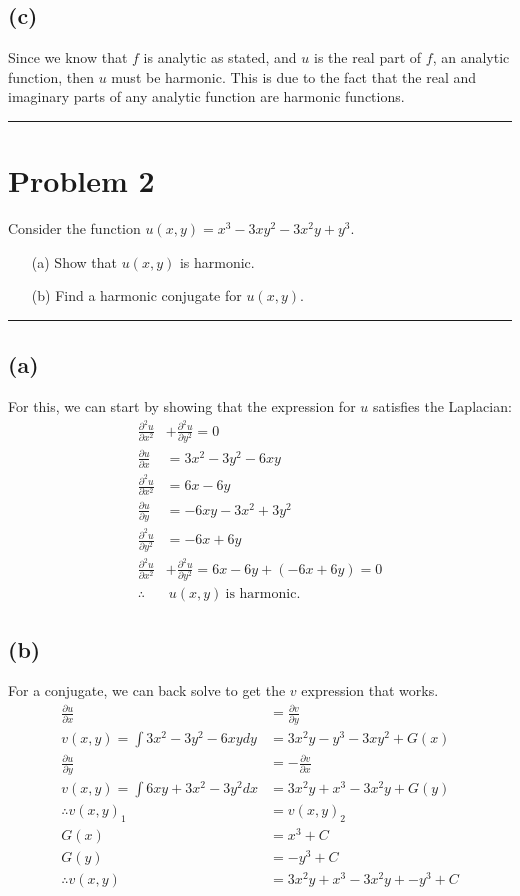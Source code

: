 \documentclass{article}
\newcommand{\parder}[2]{\frac{\partial#1}{\partial#2}}
\newcommand{\secparder}[2]{\frac{\partial^2#1}{\partial#2^2}}
\begin{document}
\subsection{(c)}
Since we know that $f$ is analytic as stated, and $u$ is the real part of $f$, an analytic function, then $u$ must be harmonic. This is due to the fact that the real and imaginary parts of any analytic function are harmonic functions.
\vspace{.2cm}
\hrule

\section*{Problem 2}
Consider the function  $u(x,y) = x^3 - 3 x y^2 - 3 x^2 y + y^3$.

\begin{enumerate}
	\item [(a)] Show that $u(x,y)$ is harmonic.
	\item [(b)] Find a harmonic conjugate for $u(x,y)$.
\end{enumerate}


\vspace{.5cm} %

\hrule
\subsection*{(a)}
For this, we can start by showing that the expression for $u$ satisfies the Laplacian:
\begin{align*}
  \secparder{u}{x} &+ \secparder{u}{y} = 0\\
  \parder{u}{x} &= 3x^2 - 3 y^2 - 6xy\\
  \secparder{u}{x} &= 6x - 6y\\
  \parder{u}{y} &= - 6 x y - 3 x^2  + 3y^2\\
  \secparder{u}{y} &= - 6 x  + 6y\\
  \secparder{u}{x} &+ \secparder{u}{y} = 6x - 6y + (- 6 x  + 6y) = 0\\
  \therefore &\ u(x,y)\ \text{is harmonic.}
\end{align*}
\subsection*{(b)}
For a conjugate, we can back solve to get the $v$ expression that works.
\begin{align*}
  \parder{u}{x} &= \parder{v}{y} \\
  v(x,y) = \int 3x^2 - 3 y^2 - 6xy dy &= 3x^2y - y^3 - 3xy^2 + G(x)\\
  \parder{u}{y} &= -\parder{v}{x} \\
  v(x,y) = \int  6 x y + 3 x^2  - 3y^2 dx &= 3x^2y + x^3 -3x^2y + G(y)\\
  \therefore  v(x,y)_1 &= v(x,y)_2 \\
  G(x) &= x^3 + C\\
  G(y) &= -y^3 + C\\
  \therefore v(x,y) &= \boxed{ 3x^2y + x^3 -3x^2y + -y^3 + C}
\end{align*}
\newpage
\end{document}
